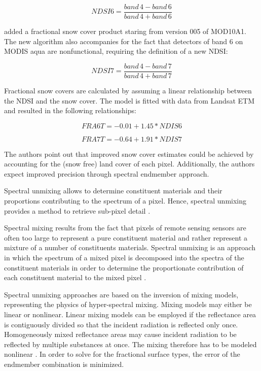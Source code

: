 \documentclass[a4paper,10pt]{article}
\begin{document}
\begin{equation}
 NDSI6 = \frac{band \, 4 -band \, 6}{band \, 4 + band \, 6}
\end{equation}

\cite{Salomonson2006, Salomonson2004} added a fractional snow cover product staring from version 005 of MOD10A1. The new algorithm also accompanies for the fact that detectors of band 6 on \gls{MODIS} aqua are nonfunctional, requiring the definition of a new \gls{NDSI}:

\begin{equation}
 NDSI7 = \frac{band \, 4 -band \, 7}{band \, 4 + band \, 7}
\end{equation}

Fractional snow covers are calculated by assuming a linear relationship between the NDSI and the snow cover. The model is fitted with data from Landsat ETM and resulted in the following relationships:

\begin{equation}
    FRA6T = -0.01 + 1.45 * NDIS6
\end{equation}

\begin{equation}
    FRA7T = -0.64 + 1.91 * NDIS7
\end{equation}

The authors point out that improved snow cover estimates could be achieved by accounting for the (snow free) land cover of each pixel. Additionally, the authors expect improved precision through spectral endmember approach. 

Spectral unmixing allows to determine constituent materials and their proportions contributing to the spectrum of a pixel. Hence, spectral unmixing provides a method to retrieve sub-pixel detail \citep{Keshava2003}. 

Spectral mixing results from the fact that pixels of remote sensing sensors are often too large to represent a pure constituent material and rather represent a mixture of a number of constituents materials. Spectral unmixing is an approach in which the spectrum of a mixed pixel is decomposed into the spectra of the constituent materials in order to determine the proportionate contribution of each constituent material to the mixed pixel \citep{Keshava2003}.

Spectral unmixing approaches are based on the inversion of mixing models, representing the physics of hyper-spectral mixing. Mixing models may either be linear or nonlinear. Linear mixing models can be employed if the reflectance area is contiguously divided so that the incident radiation is reflected only once. Homogeneously mixed reflectance areas may cause incident radiation to be reflected by multiple substances at once. The mixing therefore has to be modeled nonlinear \citep{Keshava2003}.
In order to solve for the fractional surface types, the error of the endmember combination is minimized.
\end{document}
